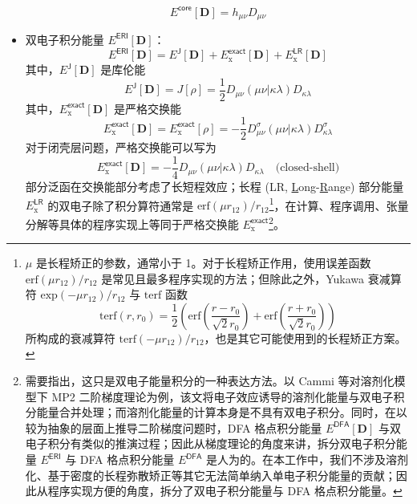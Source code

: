 \begin{itemize}[nosep]
\begin{equation}
          E^\textsf{core} [\mathbf{D}] = h_{\mu \nu} D_{\mu \nu}
        \end{equation}
  \item 双电子积分能量 $E^\textsf{ERI} [\mathbf{D}]$：
        \begin{equation}
          E^\textsf{ERI} [\mathbf{D}] = E^\textsf{J} [\mathbf{D}] + E_\mathrm{x}^\textsf{exact} [\mathbf{D}] + E_\mathrm{x}^\textsf{LR} [\mathbf{D}]
        \end{equation}
        其中，$E^\textsf{J} [\mathbf{D}]$ 是库伦能
        \begin{equation}
          E^\textsf{J} [\mathbf{D}] = J[\rho] = \frac{1}{2} D_{\mu \nu} (\mu \nu | \kappa \lambda) D_{\kappa \lambda}
        \end{equation}
        其中，$E_\mathrm{x}^\textsf{exact} [\mathbf{D}]$ 是严格交换能
        \begin{equation}
          E_\mathrm{x}^\textsf{exact} [\mathbf{D}] = E_\mathrm{x}^\textsf{exact} [\rho] = - \frac{1}{2} D_{\mu \nu}^\sigma (\mu \nu | \kappa \lambda) D_{\kappa \lambda}^\sigma
        \end{equation}
        对于闭壳层问题，严格交换能可以写为
        \begin{equation}
          E_\mathrm{x}^\textsf{exact} [\mathbf{D}] = - \frac{1}{4} D_{\mu \nu} (\mu \nu | \kappa \lambda) D_{\kappa \lambda} \quad \text{(closed-shell)}
        \end{equation}
        部分泛函在交换能部分考虑了长短程效应；长程 (LR, \underline{L}ong-\underline{R}ange) 部分能量 $E_\mathrm{x}^\textsf{LR}$ 的双电子除了积分算符通常是 $\mathrm{erf} (\mu r_{12}) / r_{12}$\footnote{$\mu$ 是长程矫正的参数，通常小于 1。对于长程矫正作用，使用误差函数 $\mathrm{erf} (\mu r_{12}) / r_{12}$ 是常见且最多程序实现的方法；但除此之外，Yukawa 衰减算符 $\mathrm{exp} (-\mu r_{12}) / r_{12}$\cite{Savin-Flad.IJQC.1995} 与 $\mathrm{terf}$ 函数 $$\mathrm{terf} (r, r_0) = \frac{1}{2} \left( \mathrm{erf} \left(\frac{r - r_0}{\sqrt{2} r_0}\right) + \mathrm{erf} \left(\frac{r + r_0}{\sqrt{2} r_0}\right) \right)$$ 所构成的衰减算符 $\mathrm{terf} (-\mu r_{12}) / r_{12}$\cite{Goldey-Head-Gordon.PCCP.2013}，也是其它可能使用到的长程矫正方案。}，在计算、程序调用、张量分解等具体的程序实现上等同于严格交换能 $E_\mathrm{x}^\textsf{exact}$\footnote{需要指出，这只是双电子能量积分的一种表达方法。以 Cammi 等\cite{Cammi-Frisch.TCA.2004}对溶剂化模型下 MP2 二阶梯度理论为例，该文将电子效应诱导的溶剂化能量与双电子积分能量合并处理；而溶剂化能量的计算本身是不具有双电子积分。同时，在以较为抽象的层面上推导二阶梯度问题时，DFA 格点积分能量 $E^\textsf{DFA} [\mathbf{D}]$ 与双电子积分有类似的推演过程；因此从梯度理论的角度来讲，拆分双电子积分能量 $E^\textsf{ERI}$ 与 DFA 格点积分能量 $E^\textsf{DFA}$ 是人为的。在本工作中，我们不涉及溶剂化、基于密度的长程弥散矫正等其它无法简单纳入单电子积分能量的贡献；因此从程序实现方便的角度，拆分了双电子积分能量与 DFA 格点积分能量。}。

\end{itemize}
